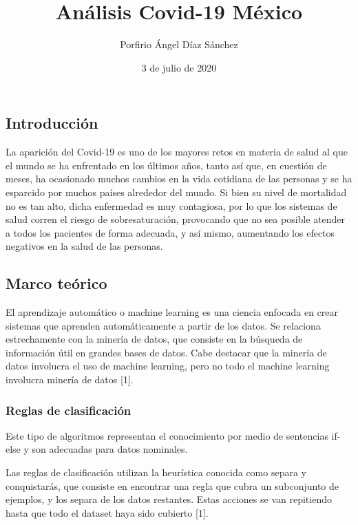 \documentclass[]{article}
\title{Análisis Covid-19 México}
\author{Porfirio Ángel Díaz Sánchez}
\date{3 de julio de 2020}
\begin{document}
\maketitle

\hypertarget{introducciuxf3n}{%
\subsection{Introducción}\label{introducciuxf3n}}

La aparición del Covid-19 es uno de los mayores retos en materia de
salud al que el mundo se ha enfrentado en los últimos años, tanto así
que, en cuestión de meses, ha ocasionado muchos cambios en la vida
cotidiana de las personas y se ha esparcido por muchos países alrededor
del mundo. Si bien su nivel de mortalidad no es tan alto, dicha
enfermedad es muy contagiosa, por lo que los sistemas de salud corren el
riesgo de sobresaturación, provocando que no sea posible atender a todos
los pacientes de forma adecuada, y así mismo, aumentando los efectos
negativos en la salud de las personas.

\hypertarget{marco-teuxf3rico}{%
\subsection{Marco teórico}\label{marco-teuxf3rico}}

El aprendizaje automático o machine learning es una ciencia enfocada en
crear sistemas que aprenden automáticamente a partir de los datos. Se
relaciona estrechamente con la minería de datos, que consiste en la
búsqueda de información útil en grandes bases de datos. Cabe destacar
que la minería de datos involucra el uso de machine learning, pero no
todo el machine learning involucra minería de datos {[}1{]}.

\hypertarget{reglas-de-clasificaciuxf3n}{%
\subsubsection{Reglas de
clasificación}\label{reglas-de-clasificaciuxf3n}}

Este tipo de algoritmos representan el conocimiento por medio de
sentencias if-else y son adecuadas para datos nominales.

Las reglas de clasificación utilizan la heurística conocida como separa
y conquistarás, que consiste en encontrar una regla que cubra un
subconjunto de ejemplos, y los separa de los datos restantes. Estas
acciones se van repitiendo hasta que todo el dataset haya sido cubierto
{[}1{]}.
\end{document}
